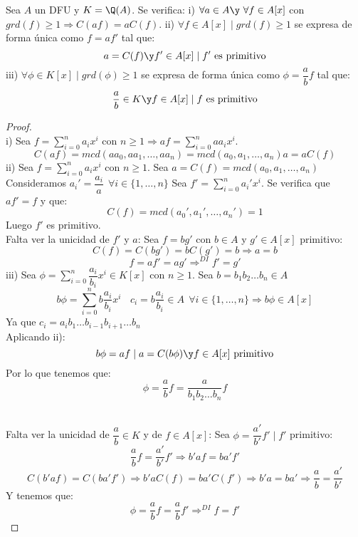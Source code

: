 \begin{lema}
    \label{lemaPropsContenido}
    Sea $A$ un DFU y $K = \Q(A)$. Se verifica:\newline
    i) $\forall a \in A \y ~\forall f \in A[x]$ con $grd(f) \geq 1 \Rightarrow C(af) = aC(f)$.\newline
    ii) $\forall f \in A[x] \mid grd(f) \geq 1$ se expresa de forma única como $f=af'$ tal que:
    $$a = C(f) \y f' \in A[x] \mid f' \mbox{ es primitivo}$$
    iii) $\forall \phi \in K[x] \mid grd(\phi) \geq 1$ se expresa de forma única como $\phi = \dfrac{a}{b}f$ tal que:
    $$\dfrac{a}{b} \in K \y f \in A[x] \mid f \mbox{ es primitivo}$$
\begin{proof}
    \ \\
    i) Sea $\displaystyle f=\sum_{i=0}^n a_i x^i$ con $\displaystyle n \geq 1 \Rightarrow af = \sum_{i=0}^n aa_i x^i$.
    $$C(af) = mcd(aa_0, aa_1, \ldots, aa_n) = mcd(a_0,a_1,\ldots, a_n)a = aC(f)$$
    ii) Sea $\displaystyle f=\sum_{i=0}^n a_i x^i$ con $n \geq 1$. Sea $a = C(f) = mcd(a_0,a_1,\ldots, a_n)$\newline
    Consideramos $a_i' = \dfrac{a_i}{a}~~\forall i \in \{1, \ldots, n\}$\newline
    Sea $\displaystyle f'=\sum_{i=0}^n a_i' x^i$. Se verifica que $af'=f$ y que:
    $$C(f) = mcd(a_0',a_1', \ldots, a_n')=1$$
    Luego $f'$ es primitivo.\\

    
    Falta ver la unicidad de $f'$ y $a$:\newline
    Sea $f=bg'$ con $b \in A$ y $g' \in A[x]$ primitivo:
    $$C(f) = C(bg') = bC(g') = b \Rightarrow a = b$$
    $$f=af'=ag' \mathop{\Rightarrow}^{DI} f' = g'$$
    iii) Sea $\displaystyle \phi = \sum_{i=0}^n \dfrac{a_i}{b_i}x^i \in K[x]$ con $n \geq 1$. Sea $b = b_1b_2\ldots b_n \in A$
    $$b\phi = \sum_{i=0}^n b\dfrac{a_i}{b_i}x^i~~~~c_i = b\dfrac{a_i}{b_i}\in A~~\forall i \in \{1, \ldots, n\}
        \Rightarrow b\phi \in A[x]$$
    Ya que $c_i = a_ib_1\ldots b_{i-1}b_{i+1}\ldots b_n$\\

    
    Aplicando ii):
    $$b\phi = af \mid a = C(b\phi) \y f\in A[x] \mbox{ primitivo}$$
    Por lo que tenemos que:
    $$\phi = \dfrac{a}{b} f = \dfrac{a}{b_1b_2\ldots b_n}f$$

    \ \\
    
    Falta ver la unicidad de $\dfrac{a}{b} \in K$ y de $f \in A[x]$:\newline
    Sea $\phi = \dfrac{a'}{b'}f' \mid f'$ primitivo:
    $$\dfrac{a}{b}f = \dfrac{a'}{b'}f' \Rightarrow b'af = ba'f'$$
    $$C(b'af) = C(ba'f') \Rightarrow b'aC(f) = ba'C(f') \Rightarrow b'a = ba' \Rightarrow \dfrac{a}{b} = \dfrac{a'}{b'}$$
    Y tenemos que:
    $$\phi = \dfrac{a}{b}f = \dfrac{a}{b}f' \mathop{\Rightarrow}^{DI} f = f'$$
\end{proof}
\end{lema}

